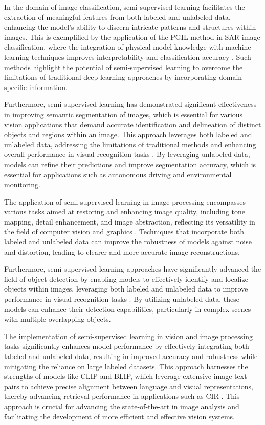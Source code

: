 In the domain of image classification, semi-supervised learning facilitates the extraction of meaningful features from both labeled and unlabeled data, enhancing the model's ability to discern intricate patterns and structures within images. This is exemplified by the application of the PGIL method in SAR image classification, where the integration of physical model knowledge with machine learning techniques improves interpretability and classification accuracy \cite{huang2022physicallyexplainablecnnsar}. Such methods highlight the potential of semi-supervised learning to overcome the limitations of traditional deep learning approaches by incorporating domain-specific information.

Furthermore, semi-supervised learning has demonstrated significant effectiveness in improving semantic segmentation of images, which is essential for various vision applications that demand accurate identification and delineation of distinct objects and regions within an image. This approach leverages both labeled and unlabeled data, addressing the limitations of traditional methods and enhancing overall performance in visual recognition tasks \cite{jang2024visualdeltageneratorlarge,pihlgren2024systematicperformanceanalysisdeep}. By leveraging unlabeled data, models can refine their predictions and improve segmentation accuracy, which is essential for applications such as autonomous driving and environmental monitoring.

The application of semi-supervised learning in image processing encompasses various tasks aimed at restoring and enhancing image quality, including tone mapping, detail enhancement, and image abstraction, reflecting its versatility in the field of computer vision and graphics \cite{fan2018imagesmoothingunsupervisedlearning}. Techniques that incorporate both labeled and unlabeled data can improve the robustness of models against noise and distortion, leading to clearer and more accurate image reconstructions.

Furthermore, semi-supervised learning approaches have significantly advanced the field of object detection by enabling models to effectively identify and localize objects within images, leveraging both labeled and unlabeled data to improve performance in visual recognition tasks \cite{jang2024visualdeltageneratorlarge}. By utilizing unlabeled data, these models can enhance their detection capabilities, particularly in complex scenes with multiple overlapping objects.

The implementation of semi-supervised learning in vision and image processing tasks significantly enhances model performance by effectively integrating both labeled and unlabeled data, resulting in improved accuracy and robustness while mitigating the reliance on large labeled datasets. This approach harnesses the strengths of models like CLIP and BLIP, which leverage extensive image-text pairs to achieve precise alignment between language and visual representations, thereby advancing retrieval performance in applications such as CIR \cite{jang2024visualdeltageneratorlarge}. This approach is crucial for advancing the state-of-the-art in image analysis and facilitating the development of more efficient and effective vision systems.

